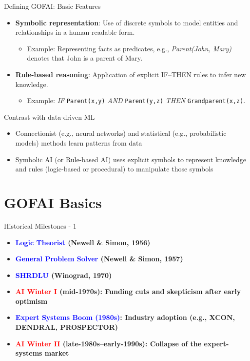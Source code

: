 \documentclass[german,10pt]{beamer}
\begin{document}
\begin{frame}{Defining GOFAI: Basic Features}
  \begin{itemize}
    \item \textbf{Symbolic representation}: Use of discrete symbols to model entities and relationships in a human-readable form. 
      \begin{itemize}
        \item Example: Representing facts as predicates, e.g., \textit{Parent(John, Mary)} denotes that John is a parent of Mary.
      \end{itemize}
    \item \textbf{Rule-based reasoning}: Application of explicit IF–THEN rules to infer new knowledge.
      \begin{itemize}
        \item Example: \emph{IF} \texttt{Parent(x,y)} \emph{AND} \texttt{Parent(y,z)} \emph{THEN} \texttt{Grandparent(x,z)}.
      \end{itemize}
\end{itemize}
\begin{alertblock}{Contrast with data-driven ML}
    \begin{itemize}
        \item Connectionist (e.g., neural networks) and statistical (e.g., probabilistic models) methods learn patterns from data 
        \item Symbolic AI (or Rule-based AI) uses explicit symbols to represent knowledge and rules (logic-based or procedural) to manipulate those symbols
    \end{itemize}
\end{alertblock}
\end{frame}

\section{GOFAI Basics}
\begin{frame}{Historical Milestones - 1}
  \begin{itemize}
    \item \textbf{\textcolor{blue}{Logic Theorist} (Newell \& Simon, 1956)}
    \item \textbf{\textcolor{blue}{General Problem Solver} (Newell \& Simon, 1957)}
    \item \textbf{\textcolor{blue}{SHRDLU} (Winograd, 1970)}
    \item \textbf{\textcolor{red}{AI Winter I} (mid-1970s): Funding cuts and skepticism after early optimism}
    \item \textbf{\textcolor{blue}{Expert Systems Boom (1980s)}: Industry adoption (e.g., XCON, DENDRAL, PROSPECTOR)}
    \item \textbf{\textcolor{red}{AI Winter II} (late-1980s–early-1990s): Collapse of the expert-systems market}
  \end{itemize}
\end{frame}
\end{document}
